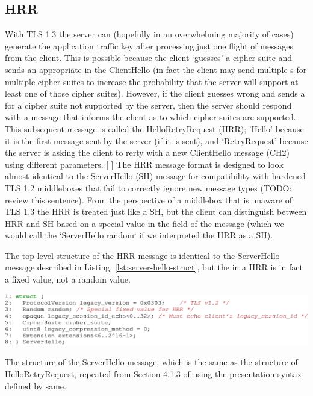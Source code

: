 \subsection{HRR}
With TLS 1.3 the server can (hopefully in an overwhelming majority of cases) generate the application traffic key after processing just one flight of messages from the client. This is possible because the client `guesses' a cipher suite and sends an appropriate  in the ClientHello (in fact the client may send multiple s for multiple cipher suites to increase the probability that the server will support at least one of those cipher suites). However, if the client guesses wrong and sends a  for a cipher suite not supported by the server, then the server should respond with a message that informs the client as to which cipher suites are supported. This subsequent message is called the HelloRetryRequest (HRR); 'Hello' because it is the first message sent by the server (if it is sent), and `RetryRequest' because the server is asking the client to rerty with a new ClientHello message (CH2) using different parameters.
[ ] The HRR message format is designed to look almost identical to the ServerHello (SH) message for compatibility with hardened TLS 1.2 middleboxes that fail to correctly ignore new message types (TODO: review this sentence).
From the perspective of a middlebox that is unaware of TLS 1.3 the HRR is treated just like a SH, but the client can distinguish between HRR and SH based on a special value in the  field of the message (which we would call the `ServerHello.random` if we interpreted the HRR as a SH).

The top-level structure of the HRR message is identical to the ServerHello message described in Listing. \ref{lst:server-hello-struct}, but the  in a HRR is in fact a fixed value, not a random value.



\begin{listing}
    \centering
    \includegraphics[width=.8\linewidth]{figure/ServerHello-struct.pdf}
    \captionsetup{width=.8\linewidth} 
    \caption[ServerHello and HelloRetryRequest Structures]{The structure of the ServerHello message, which is the same as the structure of HelloRetryRequest, repeated from Section 4.1.3 of \cite{esni} using the presentation syntax defined by same.}
    \label{lst:server-hello-struct}
\end{listing}

